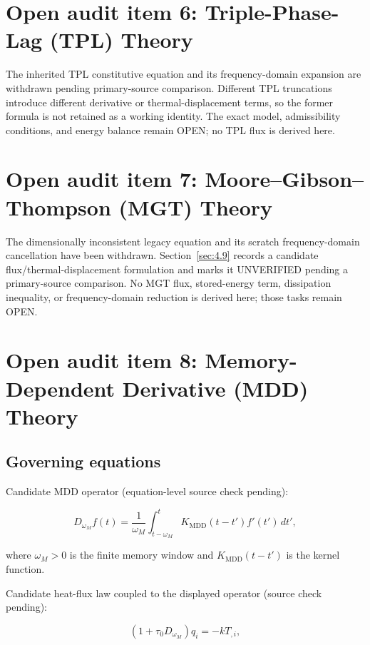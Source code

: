 \section{Open audit item 6: Triple-Phase-Lag (TPL) Theory}

The inherited TPL constitutive equation and its frequency-domain expansion are withdrawn pending primary-source comparison. Different TPL truncations introduce different derivative or thermal-displacement terms, so the former formula is not retained as a working identity. The exact model, admissibility conditions, and energy balance remain OPEN; no TPL flux is derived here.

\section{Open audit item 7: Moore--Gibson--Thompson (MGT) Theory}

The dimensionally inconsistent legacy equation and its scratch frequency-domain cancellation have been withdrawn. Section~\ref{sec:4.9} records a candidate flux/thermal-displacement formulation and marks it UNVERIFIED pending a primary-source comparison. No MGT flux, stored-energy term, dissipation inequality, or frequency-domain reduction is derived here; those tasks remain OPEN.

\section{Open audit item 8: Memory-Dependent Derivative (MDD) Theory}

\subsection{Governing equations}

Candidate MDD operator (equation-level source check pending):

\begin{equation}
D_{\omega_M} f(t) = \frac{1}{\omega_M}\int_{t-\omega_M}^{t} K_{\mathrm{MDD}}(t-t') f'(t') \, dt',
\label{ef:mdd:1}
\end{equation}

where $\omega_M > 0$ is the finite memory window and $K_{\mathrm{MDD}}(t-t')$ is the kernel function.

Candidate heat-flux law coupled to the displayed operator (source check pending):

\begin{equation}
(1 + \tau_0 D_{\omega_M})q_i = -k T_{,i},
\label{ef:mdd:2}
\end{equation}

